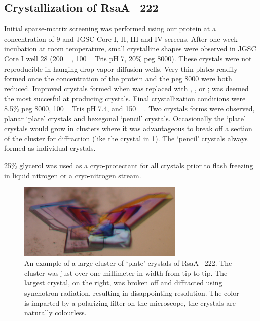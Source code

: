 \subsection{Crystallization of RsaA --222}\label{crystallization}

Initial sparse-matrix screening was performed using our protein at a
concentration of 9 \mgperml and JGSC Core I, II, III and IV screens. %
 After one week incubation at room temperature, small crystalline shapes were
observed in JGSC Core I well 28 (200 \si{\milli\molar}  , 100 \si{\milli\molar} Tris pH 7, 20\% \ac{peg}
8000). These crystals were not reproducible in hanging drop vapor
diffusion wells. Very thin plates readily formed once the concentration
of the protein and the \ac{peg} 8000 were both reduced. Improved crystals
formed when  was replaced with , , or ;  was
deemed the most succesful at producing crystals. Final crystallization
conditions were 8.5\% \ac{peg} 8000, 100 \si{\milli\molar} Tris pH 7.4, and 150 \si{\milli\molar} .
Two crystals forms were observed, planar `plate' crystals and hexegonal
`pencil' crystals. Occasionally the `plate' crystals would grow in clusters where it was advantageous to break off a section of the cluster for diffraction (like the crystal in \cref{fig:crystal-flower}). The `pencil' crystals always formed as individual crystals.

 25\% glycerol was used as a cryo-protectant for all
crystals prior to flash freezing in liquid nitrogen or a cryo-nitrogen stream.

\begin{figure}[htb]
  	\begin{center}
   		\includegraphics[width=0.7\textwidth]{crystal_chapter/img/bigflowerxtal.jpg}
   	\end{center}
   	\caption[Example of a large cluster of `plate' RsaA --222 crystals]{An example of a large cluster of `plate' crystals of RsaA --222. The cluster was just over one millimeter in width from tip to tip. The largest crystal, on the right, was broken off and diffracted using synchotron radiation, resulting in disappointing resolution. The color is imparted by a polarizing filter on the microscope, the crystals are naturally colourless.}
   	\label{fig:crystal-flower}
\end{figure}


